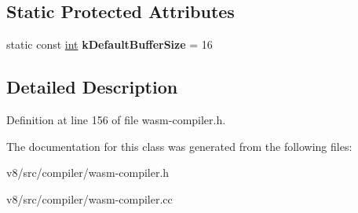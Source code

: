 \subsection*{Static Protected Attributes}
\begin{DoxyCompactItemize}
\item 
\mbox{\label{classv8_1_1internal_1_1compiler_1_1WasmGraphBuilder_a8fc35ec886696b4ffc28d148774592c3}} 
static const \mbox{\hyperlink{classint}{int}} {\bfseries k\+Default\+Buffer\+Size} = 16
\end{DoxyCompactItemize}


\subsection{Detailed Description}


Definition at line 156 of file wasm-\/compiler.\+h.



The documentation for this class was generated from the following files\+:\begin{DoxyCompactItemize}
\item 
v8/src/compiler/wasm-\/compiler.\+h\item 
v8/src/compiler/wasm-\/compiler.\+cc\end{DoxyCompactItemize}
